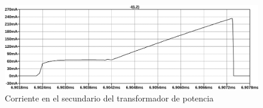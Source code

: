 \begin{figure}[ht]
    \centering
    \includegraphics[width=\textwidth]{images/sim/28.pdf}
    \caption{Corriente en el secundario del transformador de potencia}
    \label{fig:sim:28}
\end{figure}
